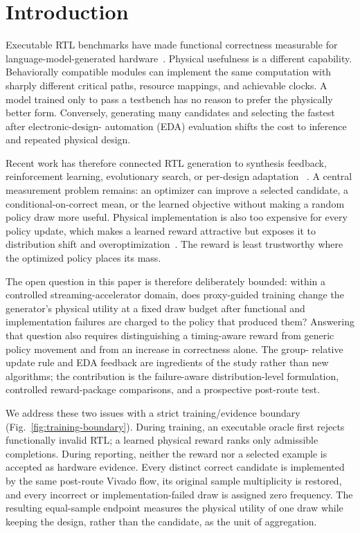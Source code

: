 \section{Introduction}
\label{sec:introduction}

Executable RTL benchmarks have made functional correctness measurable for
language-model-generated hardware~\cite{liu2023verilogeval,lu2024rtllm}.
Physical usefulness is a different capability.  Behaviorally compatible modules can
implement the same computation with sharply different critical paths,
resource mappings, and achievable clocks.  A model trained only to pass a
testbench has no reason to prefer the physically better form.  Conversely,
generating many candidates and selecting the fastest after electronic-design-
automation (EDA) evaluation shifts the cost to inference and repeated physical
design.

Recent work has therefore connected RTL generation to synthesis feedback,
reinforcement learning, evolutionary search, or per-design adaptation
~\cite{ppartl2025,chipseek2025,yao2024rtlrewriter,poet2026,
evolve2026,zhou2026alphartl,drrtl2026}.  A central measurement problem remains:
an optimizer can improve a selected candidate, a conditional-on-correct mean,
or the learned objective without making a random policy draw more useful.
Physical implementation is also too expensive for every policy update, which
makes a learned reward attractive but exposes it to distribution shift and
overoptimization~\cite{gao2023scaling}.  The reward is least trustworthy where
the optimized policy places its mass.

The open question in this paper is therefore deliberately bounded: within a
controlled streaming-accelerator domain, does proxy-guided training change the
generator's physical utility at a fixed draw budget after functional and
implementation failures are charged to the policy that produced them?
Answering that question also requires distinguishing a timing-aware reward from
generic policy movement and from an increase in correctness alone.  The group-
relative update rule and EDA feedback are ingredients of the study rather than
new algorithms; the contribution is the failure-aware distribution-level
formulation, controlled reward-package comparisons, and a prospective post-route test.

We address these two issues with a strict training/evidence boundary
(Fig.~\ref{fig:training-boundary}).  During training, an executable oracle
first rejects functionally invalid RTL; a learned physical reward ranks only
admissible completions.  During reporting, neither the reward nor a selected
example is accepted as hardware evidence.  Every distinct correct candidate is
implemented by the same post-route Vivado flow, its original sample
multiplicity is restored, and every incorrect or implementation-failed draw is
assigned zero frequency.  The resulting equal-sample endpoint measures the
physical utility of one draw while keeping the design, rather than the
candidate, as the unit of aggregation.


